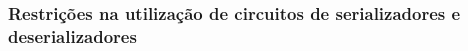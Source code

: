 %





\subsubsection*{Restrições na utilização de circuitos de serializadores e deserializadores}
	
